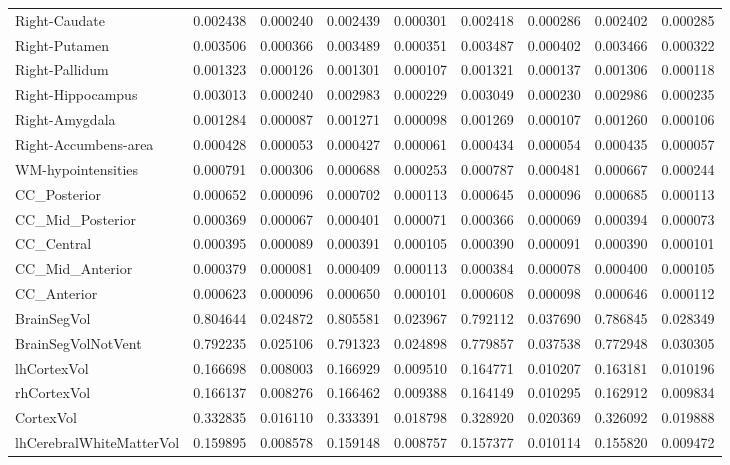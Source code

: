 \begin{table}[H]
\begin{tabular}{l|cc|cc|cc|cc}
Right-Caudate & 0.002438 & 0.000240 & 0.002439 & 0.000301 & 0.002418 & 0.000286 & 0.002402 & 0.000285 \\
Right-Putamen & 0.003506 & 0.000366 & 0.003489 & 0.000351 & 0.003487 & 0.000402 & 0.003466 & 0.000322 \\
Right-Pallidum & 0.001323 & 0.000126 & 0.001301 & 0.000107 & 0.001321 & 0.000137 & 0.001306 & 0.000118 \\
Right-Hippocampus & 0.003013 & 0.000240 & 0.002983 & 0.000229 & 0.003049 & 0.000230 & 0.002986 & 0.000235 \\
Right-Amygdala & 0.001284 & 0.000087 & 0.001271 & 0.000098 & 0.001269 & 0.000107 & 0.001260 & 0.000106 \\
Right-Accumbens-area & 0.000428 & 0.000053 & 0.000427 & 0.000061 & 0.000434 & 0.000054 & 0.000435 & 0.000057 \\
WM-hypointensities & 0.000791 & 0.000306 & 0.000688 & 0.000253 & 0.000787 & 0.000481 & 0.000667 & 0.000244 \\
CC_Posterior & 0.000652 & 0.000096 & 0.000702 & 0.000113 & 0.000645 & 0.000096 & 0.000685 & 0.000113 \\
CC_Mid_Posterior & 0.000369 & 0.000067 & 0.000401 & 0.000071 & 0.000366 & 0.000069 & 0.000394 & 0.000073 \\
CC_Central & 0.000395 & 0.000089 & 0.000391 & 0.000105 & 0.000390 & 0.000091 & 0.000390 & 0.000101 \\
CC_Mid_Anterior & 0.000379 & 0.000081 & 0.000409 & 0.000113 & 0.000384 & 0.000078 & 0.000400 & 0.000105 \\
CC_Anterior & 0.000623 & 0.000096 & 0.000650 & 0.000101 & 0.000608 & 0.000098 & 0.000646 & 0.000112 \\
BrainSegVol & 0.804644 & 0.024872 & 0.805581 & 0.023967 & 0.792112 & 0.037690 & 0.786845 & 0.028349 \\
BrainSegVolNotVent & 0.792235 & 0.025106 & 0.791323 & 0.024898 & 0.779857 & 0.037538 & 0.772948 & 0.030305 \\
lhCortexVol & 0.166698 & 0.008003 & 0.166929 & 0.009510 & 0.164771 & 0.010207 & 0.163181 & 0.010196 \\
rhCortexVol & 0.166137 & 0.008276 & 0.166462 & 0.009388 & 0.164149 & 0.010295 & 0.162912 & 0.009834 \\
CortexVol & 0.332835 & 0.016110 & 0.333391 & 0.018798 & 0.328920 & 0.020369 & 0.326092 & 0.019888 \\
lhCerebralWhiteMatterVol & 0.159895 & 0.008578 & 0.159148 & 0.008757 & 0.157377 & 0.010114 & 0.155820 & 0.009472 \\

\end{tabular}
\end{table}
